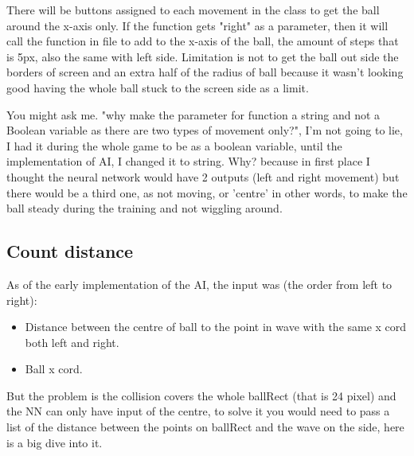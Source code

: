 There will be buttons assigned to each movement in the class to get the ball around the x-axis only. If the function gets "right" as a parameter, then it will call the  function in  file to add to the x-axis of the ball, the amount of steps that is 5px, also the same with left side. Limitation is not to get the ball out side the borders of screen and an extra half of the radius of ball because it wasn't looking good having the whole ball stuck to the screen side as a limit.

You might ask me. "why make the parameter for function a string and not a Boolean variable as there are two types of movement only?", I'm not going to lie, I had it during the whole game to be as a boolean variable, until the implementation of AI, I changed it to string. Why? because in first place I thought the neural network would have 2 outputs (left and right movement) but there would be a third one, as not moving, or 'centre' in other words, to make the ball steady during the training and not wiggling around.

\subsection{Count distance}\label{sec:count-distance}
As of the early implementation of the AI, the input was (the order from left to right):
\begin{itemize}
\item Distance between the centre of ball to the point in wave with the same x cord both left and right.
\item Ball x cord.
\end{itemize}

But the problem is the collision covers the whole ballRect (that is 24 pixel) and the NN can only have input of the centre, to solve it you would need to pass a list of the distance between the points on ballRect and the wave on the side, here is a big dive into it.

